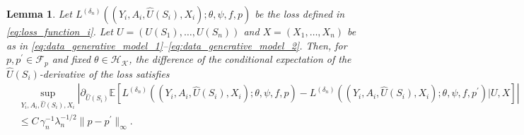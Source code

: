 \documentclass[12pt]{article}
\newtheorem{lemma}{Lemma}%
\newcommand{\E}{\mathbb{E}}
\begin{document}
\begin{lemma}\label{lemma:L_i_derivative_U_diff_p}
    Let $L^{(\delta_n)}((Y_i,A_i,\widehat U(S_i),X_i);\theta,\psi,f,p)$ be the loss defined in \eqref{eq:loss_function_i}. Let $U = (U(S_1),\ldots,U(S_n))$ and $X = (X_1,\ldots,X_n)$ be as in \eqref{eq:data_generative_model_1}--\eqref{eq:data_generative_model_2}. Then, for $p,p^\prime\in\mathcal{F}_p$ and fixed $\theta\in\mathcal{H}_\mathcal{K}$, the difference of the conditional expectation of the $\widehat{U}(S_i)$-derivative of the loss satisfies
    \begin{align*}
        &\sup_{Y_i,A_i,\widehat U(S_i),X_i}\left|\partial_{\widehat U(S_i)} \E\left[L^{(\delta_n)}((Y_i,A_i,\widehat U(S_i),X_i);\theta,\psi,f,p) - L^{(\delta_n)}((Y_i,A_i,\widehat U(S_i),X_i);\theta,\psi,f,p^\prime)\big|U,X\right]\right|\\
        &\leq C\,\gamma_n^{-1}\lambda_n^{-1/2}\|p-p^\prime\|_\infty.
    \end{align*}
\end{lemma}
\end{document}
